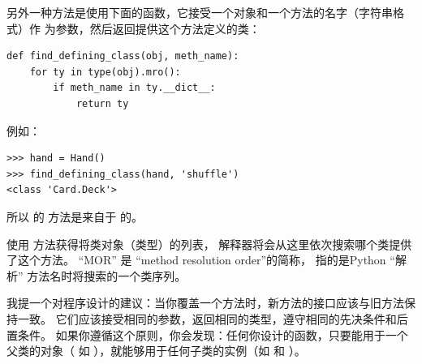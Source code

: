 

另外一种方法是使用下面的函数，它接受一个对象和一个方法的名字（字符串格式）作
为参数，然后返回提供这个方法定义的类：

\begin{lstlisting}
def find_defining_class(obj, meth_name):
    for ty in type(obj).mro():
        if meth_name in ty.__dict__:
            return ty
\end{lstlisting}

例如：

\begin{lstlisting}
>>> hand = Hand()
>>> find_defining_class(hand, 'shuffle')
<class 'Card.Deck'>
\end{lstlisting}


所以  的  方法是来自于  的。



 使用  方法获得将类对象（类型）的列表，
解释器将会从这里依次搜索哪个类提供了这个方法。  
``MOR'' 是 ``method resolution order''的简称， 指的是Python ``解析'' 方法名时将搜索的一个类序列。



我提一个对程序设计的建议：当你覆盖一个方法时，新方法的接口应该与旧方法保持一致。
它们应该接受相同的参数，返回相同的类型，遵守相同的先决条件和后置条件。
如果你遵循这个原则，你会发现：任何你设计的函数，只要能用于一个父类的对象（
如  ），就能够用于任何子类的实例（如  和  ）。

